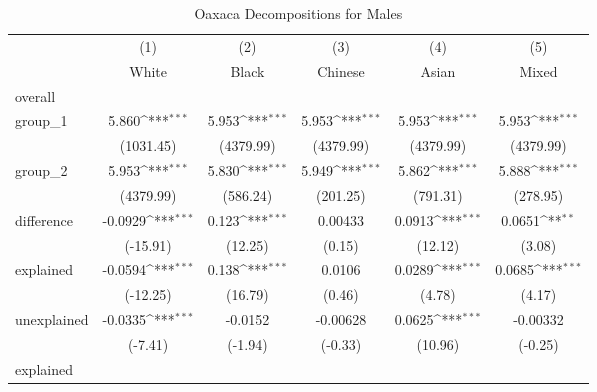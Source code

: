 \begin{table}[htbp]\centering
\def\sym#1{\ifmmode^{#1}\else\(^{#1}\)\fi}
\caption{Oaxaca Decompositions for Males\label{tab1}}
\begin{tabular}{l*{5}{c}}
\hline\hline
            &\multicolumn{1}{c}{(1)}&\multicolumn{1}{c}{(2)}&\multicolumn{1}{c}{(3)}&\multicolumn{1}{c}{(4)}&\multicolumn{1}{c}{(5)}\\
            &\multicolumn{1}{c}{White}&\multicolumn{1}{c}{Black}&\multicolumn{1}{c}{Chinese}&\multicolumn{1}{c}{Asian}&\multicolumn{1}{c}{Mixed}\\
\hline
overall     &                     &                     &                     &                     &                     \\
group\_1     &       5.860\sym{***}&       5.953\sym{***}&       5.953\sym{***}&       5.953\sym{***}&       5.953\sym{***}\\
            &   (1031.45)         &   (4379.99)         &   (4379.99)         &   (4379.99)         &   (4379.99)         \\
group\_2     &       5.953\sym{***}&       5.830\sym{***}&       5.949\sym{***}&       5.862\sym{***}&       5.888\sym{***}\\
            &   (4379.99)         &    (586.24)         &    (201.25)         &    (791.31)         &    (278.95)         \\
difference  &     -0.0929\sym{***}&       0.123\sym{***}&     0.00433         &      0.0913\sym{***}&      0.0651\sym{**} \\
            &    (-15.91)         &     (12.25)         &      (0.15)         &     (12.12)         &      (3.08)         \\
explained   &     -0.0594\sym{***}&       0.138\sym{***}&      0.0106         &      0.0289\sym{***}&      0.0685\sym{***}\\
            &    (-12.25)         &     (16.79)         &      (0.46)         &      (4.78)         &      (4.17)         \\
unexplained &     -0.0335\sym{***}&     -0.0152         &    -0.00628         &      0.0625\sym{***}&    -0.00332         \\
            &     (-7.41)         &     (-1.94)         &     (-0.33)         &     (10.96)         &     (-0.25)         \\
\hline
explained   &                     &                     &                     &                     &                     \\

\end{tabular}
\end{table}
